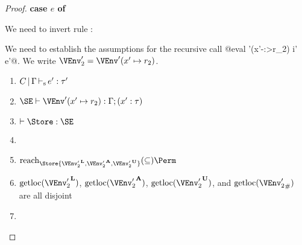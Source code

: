 \begin{proof}
  \newpage{}
  \textbf{case $e$ of}

  We need to invert rule :
  \begin{mathpar}
  \end{mathpar}

  We need to establish the assumptions for the recursive call
  @eval \Store \Perm \VEnv'(x'-:>r_2) i' e'@.
  We write $\VEnv_2' = \VEnv' (x'\mapsto r_2)$.
  \begin{enumerate}[({A1-}1)]
  \item $\inferS{C}{\E}{e'}{\tau'}$
  \item $\SE \vdash \VEnv' (x' \mapsto r_2) : \E; \bvar{x'}{\tau}$
  \item $\vdash \Store : \SE$
  \item \assumeWellformed{}
  \item $\Reach\Store{\Active{\VEnv_2'}, \MutableBorrows{\VEnv_2'},
      \ImmutableBorrows{\VEnv_2'}} \subseteq \Perm$
  \item $\Rawloc{\Active{\VEnv_2'}}$,
    $\Rawloc{\MutableBorrows{\VEnv_2'}}$,
    $\Rawloc{\ImmutableBorrows{\VEnv_2'}}$, and
    $\Rawloc{\Suspended{\VEnv_2'}}$ are all disjoint
  \item {}
  \end{enumerate}

\end{proof}

